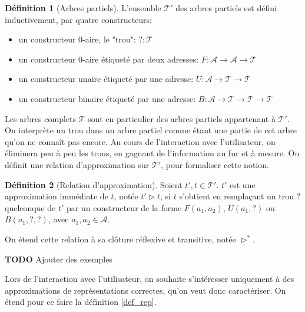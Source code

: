 \documentclass[11pt,a4paper]{article}
\theoremstyle{plain}
\theoremstyle{definition}
\newtheorem{definition}{Définition}
\theoremstyle{remark}
\newcommand*{\addresses}{\ensuremath{\mathcal{A}}}
\newcommand*{\trees}{\ensuremath{\mathcal{T}}}
\newcommand*{\treespartial}{\ensuremath{\mathcal{T'}}}
\newcommand*{\relapprox}{\ensuremath{\triangleright}}
\newcommand*{\relapproxlarge}{\ensuremath{\relapprox^*}}
\newcommand*{\unknown}{\ensuremath{?}}
\newcommand*{\todo}{{\normalfont \textbf{TODO}} }
\begin{document}
\begin{definition}[Arbres partiels]
    L'ensemble \treespartial{} des arbres partiels est défini inductivement, par quatre constructeurs:
    \begin{itemize}
      \item un constructeur $0$-aire, le "trou": $\unknown: \trees$
      \item un constructeur $0$-aire étiqueté par deux adresses: $F: \mathcal{A} \rightarrow \mathcal{A} \rightarrow \trees$
      \item un constructeur unaire étiqueté par une adresse: $U: \mathcal{A} \rightarrow \trees \rightarrow \trees$
      \item un constructeur binaire étiqueté par une adresse: $B: \mathcal{A} \rightarrow \trees \rightarrow \trees \rightarrow \trees$
    \end{itemize}
\end{definition}

Les arbres complets \trees{} sont en particulier des arbres partiels appartenant à \treespartial{}. On interprète un trou dans un arbre partiel comme étant une partie de cet arbre qu'on ne connaît pas encore. Au cours de l'interaction avec l'utilisateur, on éliminera peu à peu les trous, en gagnant de l'information au fur et à mesure. On définit une relation d'approximation sur \treespartial{}, pour formaliser cette notion.

\begin{definition}[Relation d'approximation]
    Soient $t', t \in \treespartial$. $t'$ est une approximation immédiate de $t$, notée $t' \relapprox t$, si $t$ s'obtient en remplaçant un trou $\unknown$ quelconque de $t'$ par un constructeur de la forme $F(a_1, a_2)$, $U(a_1, \unknown)$ ou $B(a_1, \unknown, \unknown)$, avec $a_1, a_2 \in \addresses$.

    On étend cette relation à sa clôture réflexive et transitive, notée $\relapproxlarge$.
\end{definition}
\todo{Ajouter des exemples}

Lors de l'interaction avec l'utilisateur, on souhaite s'intéresser uniquement à des approximations de représentations correctes, qu'on veut donc caractériser. On étend pour ce faire la définition \ref{def_rep}.
\end{document}
